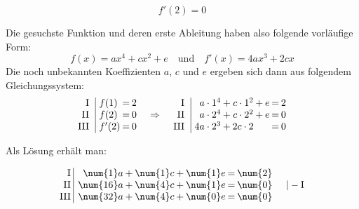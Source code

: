 \begin{exercise}
\begin{enumerate}[a)]
\begin{equation*}
              f'(2)=0
            \end{equation*}
    \end{enumerate}
    Die gesuchste Funktion und deren erste Ableitung
    haben also folgende vorläufige Form:
    \begin{equation*}
      f(x)=ax^4+cx^2+e
      \quad\text{und}\quad
      f'(x)=4ax^3+2cx
    \end{equation*}
    Die noch unbekannten Koeffizienten $a$, $c$ und
    $e$ ergeben sich dann aus folgendem
    Gleichungssystem:
    \begin{equation*}
      \setlength{\arraycolsep}{0.1em}%
      \begin{array}{r|lcr}
          \text{I}\;\; & \; f(1)  & = & 2 \\
         \text{II}\;\; & \; f(2)  & = & 0 \\
        \text{III}\;\; & \; f'(2) & = & 0
      \end{array}
      \quad\Rightarrow\quad
      \begin{array}{r|rcrcrcr}
          \text{I}\;\; & \;  a\cdot1^4 & + &  c\cdot1^2 & + & e & = & 2 \\
         \text{II}\;\; & \;  a\cdot2^4 & + &  c\cdot2^2 & + & e & = & 0 \\
        \text{III}\;\; & \; 4a\cdot2^3 & + & 2c\cdot2   &   &   & = & 0
      \end{array}
    \end{equation*}
    \par Als Lösung erhält man:\\
    \begin{minipage}[t]{0.49\linewidth}
      \vspace*{-\abovedisplayskip}
      \begin{alignat*}{1}
        &\setlength{\arraycolsep}{0.1em}%
        \begin{array}{r|rrrrrrrrrl}
          \text{I}{\,} & {\,} &  \num{1}a & + & \num{1}c & + & \num{1}e & = & \num{2} & {\quad} &            \\
         \text{II}{\,} & {\,} & \num{16}a & + & \num{4}c & + & \num{1}e & = & \num{0} & {\quad} & |-\text{I} \\
        \text{III}{\,} & {\,} & \num{32}a & + & \num{4}c & + & \num{0}e & = & \num{0} & {\quad} &
        \end{array}
        \\[1ex]&\setlength{\arraycolsep}{0.1em}%
        \begin{array}{r|rrrrrrrrrl}

\end{array}
\end{alignat*}
\end{minipage}
\end{exercise}
